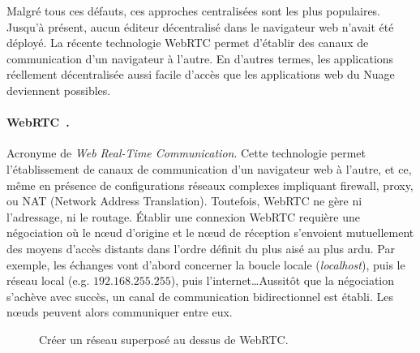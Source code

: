 Malgré tous ces défauts, ces approches centralisées sont les plus populaires.
Jusqu'à présent, aucun éditeur décentralisé dans le navigateur web n'avait été
déployé. La récente technologie WebRTC permet d'établir des canaux de
communication d'un navigateur à l'autre. En d'autres termes, les applications
réellement décentralisée aussi facile d'accès que les applications web du Nuage
deviennent possibles.

\paragraph{WebRTC~\cite{webrtc}.} Acronyme de \emph{Web Real-Time
  Communication}.  Cette technologie permet l'établissement de canaux de
communication d'un navigateur web à l'autre, et ce, même en présence de
configurations réseaux complexes impliquant firewall, proxy, ou NAT (Network
Address Translation). Toutefois, WebRTC ne gère ni l'adressage, ni le routage.
Établir une connexion WebRTC requière une négociation où le nœud d'origine et le
nœud de réception s'envoient mutuellement des moyens d'accès distants dans
l'ordre définit du plus aisé au plus ardu. Par exemple, les échanges vont
d'abord concerner la boucle locale (\emph{localhost}), puis le réseau local
(e.g. $192.168.255.255$), puis l'internet\ldots Aussitôt que la négociation
s'achève avec succès, un canal de communication bidirectionnel est établi. Les
nœuds peuvent alors communiquer entre eux.

\begin{figure*}
  \begin{center}
    \hspace{5pt}
    \hspace{5pt}
    \caption{\label{fig:webrtc}Créer un réseau superposé au dessus de WebRTC.}
  \end{center}
\end{figure*}


